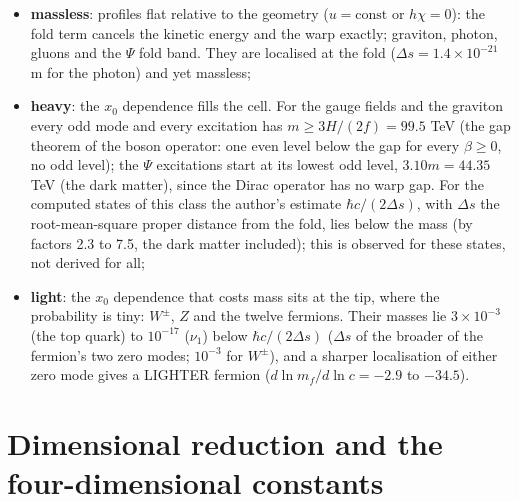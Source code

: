 \documentclass[
  10pt,
]{article}
\providecommand{\tightlist}{%
  \setlength{\itemsep}{0pt}\setlength{\parskip}{0pt}}
\begin{document}
\begin{itemize}
\tightlist
\item
  \textbf{massless}: profiles flat relative to the geometry
  (\(u = \text{const}\) or \(h\chi = 0\)): the fold term cancels the
  kinetic energy and the warp exactly; graviton, photon, gluons and the
  \(\Psi\) fold band. They are localised at the fold
  (\(\Delta s = 1.4\times10^{-21}\) m for the photon) and yet massless;
\item
  \textbf{heavy}: the \(x_0\) dependence fills the cell. For the gauge
  fields and the graviton every odd mode and every excitation has
  \(m \ge 3H/(2f) = 99.5\) TeV (the gap theorem of the boson operator:
  one even level below the gap for every \(\beta \ge 0\), no odd level);
  the \(\Psi\) excitations start at its lowest odd level,
  \(3.10m = 44.35\) TeV (the dark matter), since the Dirac operator has
  no warp gap. For the computed states of this class the author's
  estimate \(\hbar c/(2\Delta s)\), with \(\Delta s\) the
  root-mean-square proper distance from the fold, lies below the mass
  (by factors 2.3 to 7.5, the dark matter included); this is observed
  for these states, not derived for all;
\item
  \textbf{light}: the \(x_0\) dependence that costs mass sits at the
  tip, where the probability is tiny: \(W^\pm\), \(Z\) and the twelve
  fermions. Their masses lie \(3\times10^{-3}\) (the top quark) to
  \(10^{-17}\) (\(\nu_1\)) below \(\hbar c/(2\Delta s)\) (\(\Delta s\)
  of the broader of the fermion's two zero modes; \(10^{-3}\) for
  \(W^\pm\)), and a sharper localisation of either zero mode gives a
  LIGHTER fermion (\(d\ln m_f/d\ln c = -2.9\) to \(-34.5\)).
\end{itemize}

\hypertarget{dimensional-reduction-and-the-four-dimensional-constants}{%
\section{Dimensional reduction and the four-dimensional
constants}\label{dimensional-reduction-and-the-four-dimensional-constants}}
\end{document}
